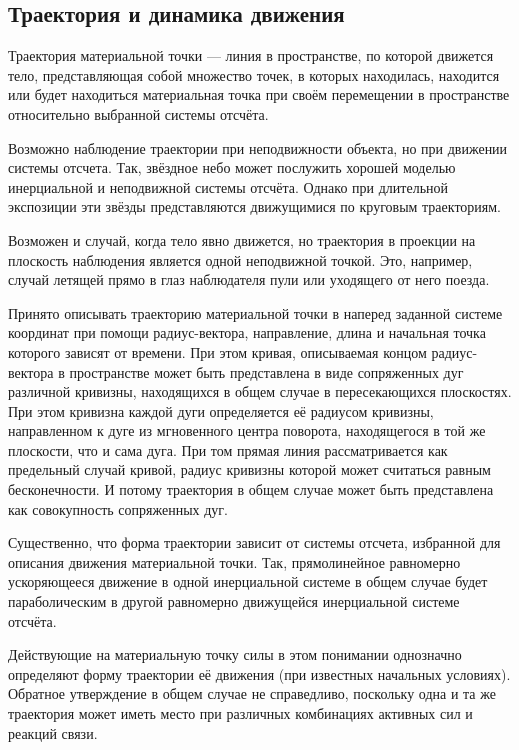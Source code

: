 \subsection{Траектория и динамика движения}
\label{sub:domain:subsec_trajectory}

Траектория материальной точки — линия в пространстве, по которой движется тело, представляющая собой множество точек, в которых находилась, находится или будет находиться материальная точка при своём перемещении в пространстве относительно выбранной системы отсчёта. 

Возможно наблюдение траектории при неподвижности объекта, но при движении системы отсчета. Так, звёздное небо может послужить хорошей моделью инерциальной и неподвижной системы отсчёта. Однако при длительной экспозиции эти звёзды представляются движущимися по круговым траекториям.

Возможен и случай, когда тело явно движется, но траектория в проекции на плоскость наблюдения является одной неподвижной точкой. Это, например, случай летящей прямо в глаз наблюдателя пули или уходящего от него поезда.

Принято описывать траекторию материальной точки в наперед заданной системе координат при помощи радиус-вектора, направление, длина и начальная точка которого зависят от времени. При этом кривая, описываемая концом радиус-вектора в пространстве может быть представлена в виде сопряженных дуг различной кривизны, находящихся в общем случае в пересекающихся плоскостях. При этом кривизна каждой дуги определяется её радиусом кривизны, направленном к дуге из мгновенного центра поворота, находящегося в той же плоскости, что и сама дуга. При том прямая линия рассматривается как предельный случай кривой, радиус кривизны которой может считаться равным бесконечности. И потому траектория в общем случае может быть представлена как совокупность сопряженных дуг.

Существенно, что форма траектории зависит от системы отсчета, избранной для описания движения материальной точки. Так, прямолинейное равномерно ускоряющееся движение в одной инерциальной системе в общем случае будет параболическим в другой равномерно движущейся инерциальной системе отсчёта.


Действующие на материальную точку силы в этом понимании однозначно определяют форму траектории её движения (при известных начальных условиях). Обратное утверждение в общем случае не справедливо, поскольку одна и та же траектория может иметь место при различных комбинациях активных сил и реакций связи.

